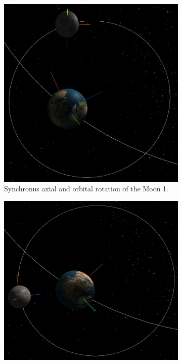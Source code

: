\documentclass[12pt]{article}
\begin{document}
 \begin{figure}[H]
        \centering
        \begin{subfigure}[b]{0.4\textwidth}
                \includegraphics[width=\textwidth]{images/syncrotation1}
                \caption{Synchronus axial and orbital rotation of the Moon 1.}
                \label{fig: Synchronus axial and orbital rotation of the Moon.}
	 \end{subfigure}
        \begin{subfigure}[b]{0.4\textwidth}
                \includegraphics[width=\textwidth]{images/syncrotation2}

\end{subfigure}
\end{figure}
\end{document}
